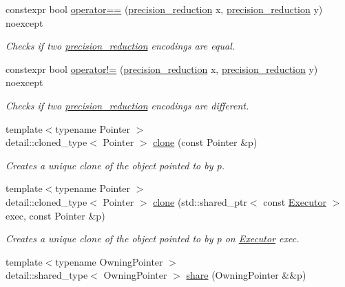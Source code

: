 \begin{DoxyCompactItemize}
\item 
constexpr bool \hyperlink{namespacegko_a4dbafa6e062c2036991ec8c3f6b201cf}{operator==} (\hyperlink{classgko_1_1precision__reduction}{precision\+\_\+reduction} x, \hyperlink{classgko_1_1precision__reduction}{precision\+\_\+reduction} y) noexcept
\begin{DoxyCompactList}\small\item\em Checks if two \hyperlink{classgko_1_1precision__reduction}{precision\+\_\+reduction} encodings are equal. \end{DoxyCompactList}\item 
constexpr bool \hyperlink{namespacegko_a61d408b4cd77aae6cac7a40c8307fddb}{operator!=} (\hyperlink{classgko_1_1precision__reduction}{precision\+\_\+reduction} x, \hyperlink{classgko_1_1precision__reduction}{precision\+\_\+reduction} y) noexcept
\begin{DoxyCompactList}\small\item\em Checks if two \hyperlink{classgko_1_1precision__reduction}{precision\+\_\+reduction} encodings are different. \end{DoxyCompactList}\item 
{\footnotesize template$<$typename Pointer $>$ }\\detail\+::cloned\+\_\+type$<$ Pointer $>$ \hyperlink{namespacegko_a1beb80750459e4201aa9d882d2d074c3}{clone} (const Pointer \&p)
\begin{DoxyCompactList}\small\item\em Creates a unique clone of the object pointed to by {\ttfamily p}. \end{DoxyCompactList}\item 
{\footnotesize template$<$typename Pointer $>$ }\\detail\+::cloned\+\_\+type$<$ Pointer $>$ \hyperlink{namespacegko_a13b00a9dd24aa08d4495762d89f3762a}{clone} (std\+::shared\+\_\+ptr$<$ const \hyperlink{classgko_1_1Executor}{Executor} $>$ exec, const Pointer \&p)
\begin{DoxyCompactList}\small\item\em Creates a unique clone of the object pointed to by {\ttfamily p} on \hyperlink{classgko_1_1Executor}{Executor} {\ttfamily exec}. \end{DoxyCompactList}\item 
{\footnotesize template$<$typename Owning\+Pointer $>$ }\\detail\+::shared\+\_\+type$<$ Owning\+Pointer $>$ \hyperlink{namespacegko_a3ce296f73db0ff398bdea6009a3a5c58}{share} (Owning\+Pointer \&\&p)

\end{DoxyCompactItemize}
